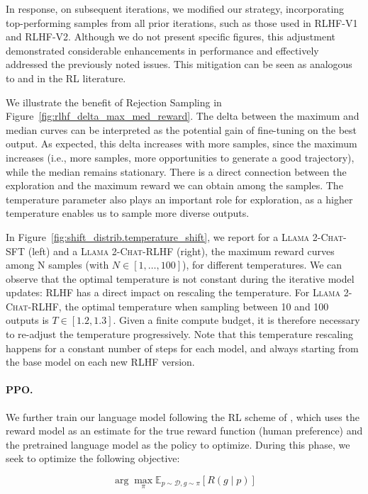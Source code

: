 \documentclass{article}
\newcommand{\modelname}{\textsc{Llama 2-Chat}\xspace}
\begin{document}
In response, on subsequent iterations, we modified our strategy, incorporating top-performing samples from all prior iterations, such as those used in RLHF-V1 and RLHF-V2. Although we do not present specific figures, this adjustment demonstrated considerable enhancements in performance and effectively addressed the previously noted issues. This mitigation can be seen as analogous to \cite{synnaeve2019growing} and  \cite{vinyals2019grandmaster} in the RL literature.

We illustrate the benefit of Rejection Sampling in Figure~\ref{fig:rlhf_delta_max_med_reward}. The delta between the maximum and median curves can be interpreted as the potential gain of fine-tuning on the best output. As expected, this delta increases with more samples, since the maximum increases (i.e., more samples, more opportunities to generate a good trajectory), while the median remains stationary. There is a direct connection between the exploration and the maximum reward we can obtain among the samples. The temperature parameter also plays an important role for exploration, as a higher temperature enables us to sample more diverse outputs.

In Figure~\ref{fig:shift_distrib.temperature_shift}, we report for a \modelname-SFT (left) and a \modelname-RLHF (right), the maximum reward curves among N samples (with $N \in [1, \ldots, 100]$), for different temperatures. We can observe that the optimal temperature is not constant during the iterative model updates: RLHF has a direct impact on rescaling the temperature. For \modelname-RLHF, the optimal temperature when sampling between 10 and 100 outputs is $T \in [1.2, 1.3]$. Given a finite compute budget, it is therefore necessary to re-adjust the temperature progressively. Note that this temperature rescaling happens for a constant number of steps for each model, and always starting from the base model on each new RLHF version. 

\paragraph{PPO.}

We further train our language model following the RL scheme of \cite{stienon2020learning}, which uses the reward model as an estimate for the true reward function (human preference) and the pretrained language model as the policy to optimize. During this phase, we seek to optimize the following objective:

\begin{equation}
   \arg \max _\pi \mathbb{E}_{p \sim \mathcal{D}, g \sim \pi}[R(g \mid p)]
\end{equation}
\end{document}
